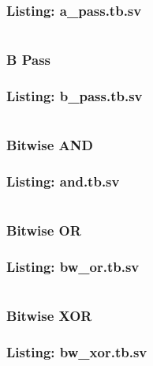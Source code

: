 \documentclass[12pt,letterpaper]{article}
\begin{document}
\subsubsection*{Listing: a\_pass.tb.sv}
\inputminted[bgcolor = bggray, linenos, fontsize = \footnotesize, breaklines]{sv}{"../ALU_SystemVerilog/functions/testbenches/a_pass.tb.sv"}


\subsubsection{B Pass}
\subsubsection*{Listing: b\_pass.tb.sv}
\inputminted[bgcolor = bggray, linenos, fontsize = \footnotesize, breaklines]{sv}{"../ALU_SystemVerilog/functions/testbenches/b_pass.tb.sv"}


\subsubsection{Bitwise AND}
\subsubsection*{Listing: and.tb.sv}
\inputminted[bgcolor = bggray, linenos, fontsize = \footnotesize, breaklines]{sv}{"../ALU_SystemVerilog/functions/testbenches/and.tb.sv"}


\subsubsection{Bitwise OR}
\subsubsection*{Listing: bw\_or.tb.sv}
\inputminted[bgcolor = bggray, linenos, fontsize = \footnotesize, breaklines]{sv}{"../ALU_SystemVerilog/functions/testbenches/bw_or.tb.sv"}


\subsubsection{Bitwise XOR}
\subsubsection*{Listing: bw\_xor.tb.sv}
\inputminted[bgcolor = bggray, linenos, fontsize = \footnotesize, breaklines]{sv}{"../ALU_SystemVerilog/functions/testbenches/bw_xor.tb.sv"}
\end{document}
